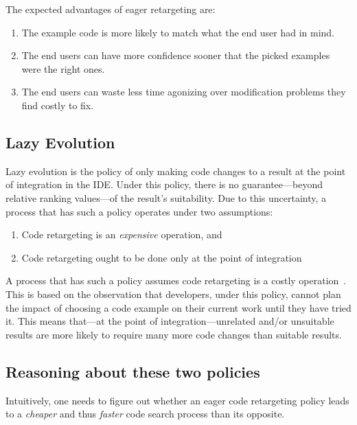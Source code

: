The expected advantages of eager retargeting are:

\begin{enumerate}
	\item The example code is more likely to match what the end user had in mind.
	\item The end users can have more confidence sooner that the picked examples were the right ones.
	\item The end users can waste less time agonizing over modification problems they find costly to fix. 
\end{enumerate}

% 

\subsection{Lazy Evolution}

Lazy evolution is the policy of only making code changes to a result at the point of integration in the IDE. Under this policy, there is no guarantee---beyond relative ranking values---of the result's suitability. Due to this uncertainty, a process that has such a policy operates under two assumptions:

\begin{enumerate}
	\item Code retargeting is an \emph{expensive} operation, and
	\item Code retargeting ought to be done only at the point of integration
\end{enumerate}

A process that has such a policy assumes code retargeting is a costly operation~\cite{Brandt:2009ew, Wightman:2012gc}. This is based on the observation that developers, under this policy, cannot plan the impact of choosing a code example on their current work until they have tried it. This means that---at the point of integration---unrelated and/or unsuitable results are more likely to require many more code changes than suitable results.
% 

\subsection{Reasoning about these two policies}

Intuitively, one needs to figure out whether an eager code retargeting policy leads to a \emph{cheaper} and thus \emph{faster} code search process than its opposite. 


